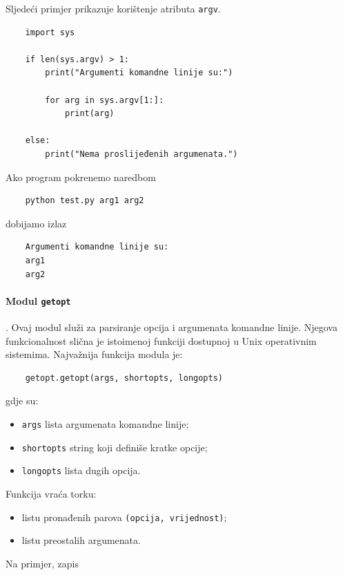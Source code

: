 Sljedeći primjer prikazuje korištenje atributa \texttt{argv}.

\begin{verbatim}
	import sys
	
	if len(sys.argv) > 1:
	    print("Argumenti komandne linije su:")
	
	    for arg in sys.argv[1:]:
	        print(arg)
	 
	else:
	    print("Nema proslijeđenih argumenata.")
\end{verbatim}

Ako program pokrenemo naredbom

\begin{verbatim}
	python test.py arg1 arg2
\end{verbatim}

dobijamo izlaz

\begin{verbatim}
	Argumenti komandne linije su:
	arg1
	arg2
\end{verbatim}

\paragraph{Modul \texttt{getopt}}.   Ovaj modul služi za parsiranje opcija i argumenata komandne linije. Njegova funkcionalnost slična je istoimenoj funkciji dostupnoj u Unix operativnim sistemima. Najvažnija funkcija modula je:

\begin{verbatim}
	getopt.getopt(args, shortopts, longopts)
\end{verbatim}

gdje su:

\begin{itemize}
	\item \texttt{args} lista argumenata komandne linije;
	\item \texttt{shortopts} string koji definiše kratke opcije;
	\item \texttt{longopts} lista dugih opcija.
\end{itemize}

Funkcija vraća torku:

\begin{itemize}
	\item listu pronađenih parova \texttt{(opcija, vrijednost)};
	\item listu preostalih argumenata.
\end{itemize}

Na primjer, zapis

